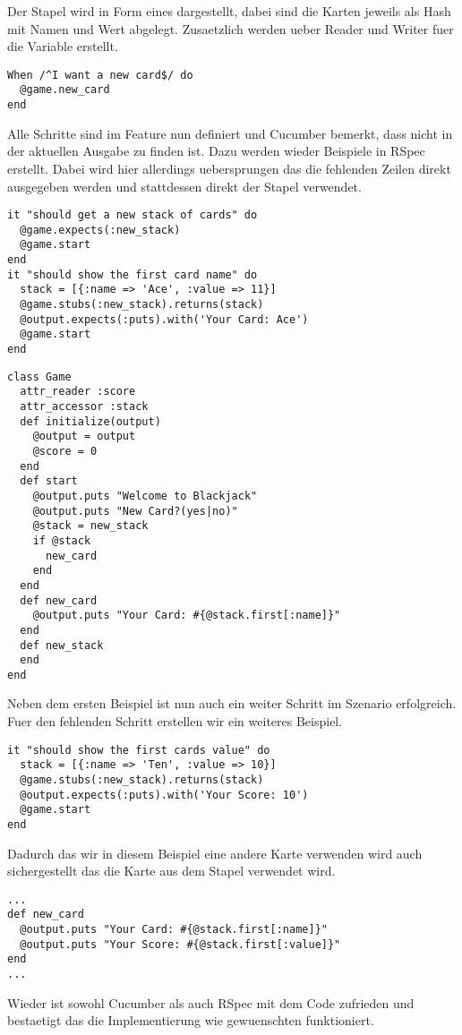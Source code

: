 Der Stapel wird in Form eines  dargestellt, dabei sind die Karten jeweils als Hash mit Namen und Wert abgelegt.
Zusaetzlich werden ueber  Reader und Writer fuer die Variable  erstellt.

\begin{lstlisting}
When /^I want a new card$/ do
  @game.new_card
end
\end{lstlisting}

Alle Schritte sind im Feature nun definiert und Cucumber bemerkt, dass  nicht in der aktuellen Ausgabe zu finden ist.
Dazu werden wieder Beispiele in RSpec erstellt. Dabei wird hier allerdings uebersprungen das die fehlenden Zeilen direkt ausgegeben werden und stattdessen direkt der Stapel verwendet.

\begin{lstlisting}
it "should get a new stack of cards" do
  @game.expects(:new_stack)
  @game.start
end
it "should show the first card name" do
  stack = [{:name => 'Ace', :value => 11}]
  @game.stubs(:new_stack).returns(stack)
  @output.expects(:puts).with('Your Card: Ace')
  @game.start
end
\end{lstlisting}

\begin{lstlisting}
class Game
  attr_reader :score
  attr_accessor :stack
  def initialize(output)
    @output = output
    @score = 0
  end
  def start
    @output.puts "Welcome to Blackjack"
    @output.puts "New Card?(yes|no)"
    @stack = new_stack
    if @stack
      new_card
    end
  end
  def new_card
    @output.puts "Your Card: #{@stack.first[:name]}"
  end
  def new_stack
  end
end
\end{lstlisting}

Neben dem ersten Beispiel ist nun auch ein weiter Schritt im Szenario erfolgreich. Fuer den fehlenden Schritt erstellen wir ein weiteres Beispiel.

\begin{lstlisting}
it "should show the first cards value" do
  stack = [{:name => 'Ten', :value => 10}]
  @game.stubs(:new_stack).returns(stack)
  @output.expects(:puts).with('Your Score: 10')
  @game.start
end
\end{lstlisting}

Dadurch das wir in diesem Beispiel eine andere Karte verwenden wird auch sichergestellt das die Karte aus dem Stapel verwendet wird.

\begin{lstlisting}
...
def new_card
  @output.puts "Your Card: #{@stack.first[:name]}"
  @output.puts "Your Score: #{@stack.first[:value]}"
end
...
\end{lstlisting}

Wieder ist sowohl Cucumber als auch RSpec mit dem Code zufrieden und bestaetigt das die Implementierung wie gewuenschten funktioniert.




